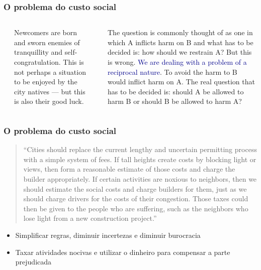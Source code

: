 \documentclass[%
    9pt, 
    aspectratio=169,
]{beamer}
\begin{document}
\begin{frame}
    \frametitle{O problema do custo social}
    \begin{columns}[T]
        \cite{bauman2003city}

        Newcomers are born and sworn enemies of tranquillity and self-congratulation. This is not perhaps a situation to be enjoyed by the city natives --- but this is also their good luck.

        \cite{coase2013problem}

        The question is commonly thought of as one in which A inﬂicts harm on B and what has to be decided is: how should we restrain A? But this is wrong. \textcolor{DarkBlue}{We are dealing with a problem of a reciprocal nature}. To avoid the harm to B would inﬂict harm on A. The real question that has to be decided is: should A be allowed to harm B or should B be allowed to harm A?     

    \end{columns}
\end{frame}

\begin{frame}
    \frametitle{O problema do custo social}

    \begin{quote}
        ``Cities should replace the current lengthy and uncertain permitting process with a simple system of fees. If tall heights create costs by blocking light or views, then form a reasonable estimate of those costs and charge the builder appropriately. If certain activities are noxious to neighbors, then we should estimate the social costs and charge builders for them, just as we should charge drivers for the costs of their congestion. Those taxes could then be given to the people who are suffering, such as the neighbors who lose light from a new construction project.''

    \end{quote}

    \begin{itemize}
        \item<2> Simplificar regras, diminuir incertezas e diminuir burocracia
        \item<2> Taxar atividades nocivas e utilizar o dinheiro para compensar a parte prejudicada
    \end{itemize}
    
\end{frame}
\end{document}

